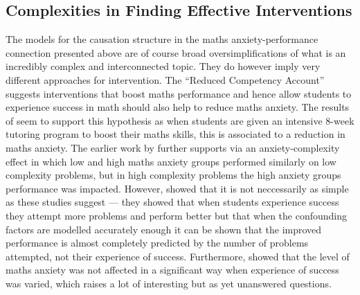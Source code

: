 \documentclass[twoside,12pt,a4paper]{report}
\begin{document}
\subsection*{Complexities in Finding Effective Interventions}

The models for the causation structure in the maths anxiety-performance connection presented above are of course broad oversimplifications of what is an incredibly complex and interconnected topic. They do however imply very different approaches for intervention. The ``Reduced Competency Account'' suggests interventions that boost maths performance and hence allow students to experience success in math should also help to reduce maths anxiety. The results of   seem to support this hypothesis as when students are given an intensive 8-week tutoring program to boost their maths skills, this is associated to a reduction in maths anxiety. The earlier work by  further supports via an anxiety-complexity effect in which low and high maths anxiety groups performed similarly on low complexity problems, but in high complexity problems the high anxiety groups performance was impacted. However,  showed that it is not neccessarily as simple as these studies suggest --- they showed that when students experience success they attempt more problems and perform better but that when the confounding factors are modelled accurately enough it can be shown that the improved performance is almost completely predicted by the number of problems attempted, not their experience of success. Furthermore,  showed that the level of maths anxiety was not affected in a significant way when experience of success was varied, which raises a lot of interesting but as yet unanswered questions. 
	
\end{document}
